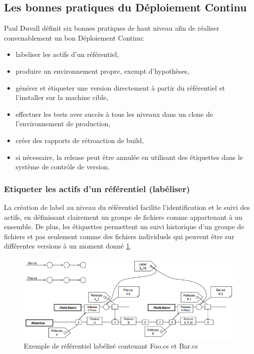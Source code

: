    \subsection{Les bonnes pratiques du Déploiement Continu}
    Paul Duvall définit six bonnes pratiques de haut niveau afin de réaliser convenablement un bon Déploiement Continu:\\
    \begin{itemize}
      \item labeliser les actifs d'un référentiel,
      \item produire un environnement propre, exempt d'hypothèses,
      \item générer et étiqueter une version directement à partir du référentiel et l'installer sur la machine cible,
      \item effectuer les tests avec succès à tous les niveaux dans un clone de l'environnement de production,
      \item créer des rapports de rétroaction de build,
      \item	si nécessaire, la release peut être annulée en utilisant des étiquettes dans le système de contrôle de version.\\
    \end{itemize}

      \subsubsection{Etiqueter les actifs d’un référentiel (labéliser)}\label{Label}
      La création de label au niveau du référentiel facilite l'identification et le suivi des actifs, en définissant clairement un groupe de fichiers comme appartenant à un ensemble. De plus, les étiquettes permettent un suivi historique d'un groupe de fichiers et pas seulement comme des fichiers individuels qui peuvent être sur différentes versions à un moment donné \ref{Labels Referential}.

      \begin{figure}
        \begin{center}
          \includegraphics[scale=0.7]{images/Labels.png}
        \end{center}
        \caption{Exemple de référentiel labélisé contenant Foo.cs et Bar.cs}
        \label{Labels Referential}
      \end{figure}

